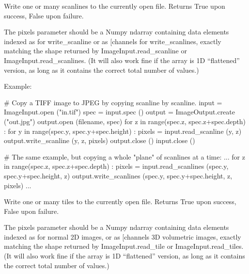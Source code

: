 
Write one or many scanlines to the currently open file.
Returns {\cf True} upon success, {\cf False} upon failure.

The {\cf pixels} parameter
should be a Numpy {\cf ndarray} containing data elements indexed as
{\cf [x][channel]} for {\cf write_scanline} or as {\cf [y][x][channels}
for {\cf write_scanlines}, exactly matching the shape returned by
{\cf ImageInput.read_scanline} or {\cf ImageInput.read_scanlines}.
(It will also work fine if the array is 1D ``flattened'' version, as long
as it contains the correct total number of values.)

\noindent Example:
\begin{code}
    # Copy a TIFF image to JPEG by copying scanline by scanline.
    input = ImageInput.open ("in.tif")
    spec = input.spec ()
    output = ImageOutput.create ("out.jpg")
    output.open (filename, spec)
    for z in range(spec.z, spec.z+spec.depth) :
        for y in range(spec.y, spec.y+spec.height) :
            pixels = input.read_scanline (y, z)
            output.write_scanline (y, z, pixels)
    output.close ()
    input.close ()

    # The same example, but copying a whole "plane" of scanlines at a time:
    ...
    for z in range(spec.z, spec.z+spec.depth) :
        pixels = input.read_scanlines (spec.y, spec.y+spec.height, z)
        output.write_scanlines (spec.y, spec.y+spec.height, z, pixels)
    ...
\end{code}
\apiend


Write one or many tiles to the currently open file.
Returns {\cf True} upon success, {\cf False} upon failure.

The {\cf pixels} parameter
should be a Numpy {\cf ndarray} containing data elements indexed as
{\cf [y][x][channel]} for normal 2D images, or as {\cf [z][y][x][channels}
3D volumetric images, exactly matching the shape returned by
{\cf ImageInput.read_tile} or {\cf ImageInput.read_tiles}.
(It will also work fine if the array is 1D ``flattened'' version, as long
as it contains the correct total number of values.)

